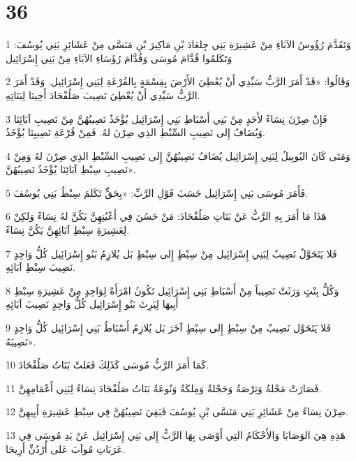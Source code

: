 \chapter{36}

\par 1 وَتَقَدَّمَ رُؤُوسُ الآبَاءِ مِنْ عَشِيرَةِ بَنِي جِلعَادَ بْنِ مَاكِيرَ بْنِ مَنَسَّى مِنْ عَشَائِرِ بَنِي يُوسُفَ: وَتَكَلمُوا قُدَّامَ مُوسَى وَقُدَّامَ رُؤَسَاءِ الآبَاءِ مِنْ بَنِي إِسْرَائِيل
\par 2 وَقَالُوا: «قَدْ أَمَرَ الرَّبُّ سَيِّدِي أَنْ يُعْطِيَ الأَرْضَ بِقِسْمَةٍ بِالقُرْعَةِ لِبَنِي إِسْرَائِيل. وَقَدْ أَمَرَ الرَّبُّ سَيِّدِي أَنْ يُعْطِيَ نَصِيبَ صَلُفْحَادَ أَخِينَا لِبَنَاتِهِ.
\par 3 فَإِنْ صِرْنَ نِسَاءً لأَحَدٍ مِنْ بَنِي أَسْبَاطِ بَنِي إِسْرَائِيل يُؤْخَذُ نَصِيبُهُنَّ مِنْ نَصِيبِ آبَائِنَا وَيُضَافُ إِلى نَصِيبِ السِّبْطِ الذِي صِرْنَ لهُ. فَمِنْ قُرْعَةِ نَصِيبِنَا يُؤْخَذُ.
\par 4 وَمَتَى كَانَ اليُوبِيلُ لِبَنِي إِسْرَائِيل يُضَافُ نَصِيبُهُنَّ إِلى نَصِيبِ السِّبْطِ الذِي صِرْنَ لهُ وَمِنْ نَصِيبِ سِبْطِ آبَائِنَا يُؤْخَذُ نَصِيبُهُنَّ».
\par 5 فَأَمَرَ مُوسَى بَنِي إِسْرَائِيل حَسَبَ قَوْلِ الرَّبِّ: «بِحَقٍّ تَكَلمَ سِبْطُ بَنِي يُوسُفَ.
\par 6 هَذَا مَا أَمَرَ بِهِ الرَّبُّ عَنْ بَنَاتِ صَلُفْحَادَ: مَنْ حَسُنَ فِي أَعْيُنِهِنَّ يَكُنَّ لهُ نِسَاءً وَلكِنْ لِعَشِيرَةِ سِبْطِ آبَائِهِنَّ يَكُنَّ نِسَاءً.
\par 7 فَلا يَتَحَوَّلُ نَصِيبٌ لِبَنِي إِسْرَائِيل مِنْ سِبْطٍ إِلى سِبْطٍ بَل يُلازِمُ بَنُو إِسْرَائِيل كُلُّ وَاحِدٍ نَصِيبَ سِبْطِ آبَائِهِ.
\par 8 وَكُلُّ بِنْتٍ وَرَثَتْ نَصِيباً مِنْ أَسْبَاطِ بَنِي إِسْرَائِيل تَكُونُ امْرَأَةً لِوَاحِدٍ مِنْ عَشِيرَةِ سِبْطِ أَبِيهَا لِيَرِثَ بَنُو إِسْرَائِيل كُلُّ وَاحِدٍ نَصِيبَ آبَائِهِ
\par 9 فَلا يَتَحَوَّل نَصِيبٌ مِنْ سِبْطٍ إِلى سِبْطٍ آخَرَ بَل يُلازِمُ أَسْبَاطُ بَنِي إِسْرَائِيل كُلُّ وَاحِدٍ نَصِيبَهُ».
\par 10 كَمَا أَمَرَ الرَّبُّ مُوسَى كَذَلِكَ فَعَلتْ بَنَاتُ صَلُفْحَادَ.
\par 11 فَصَارَتْ مَحْلةُ وَتِرْصَةُ وَحَجْلةُ وَمِلكَةُ وَنُوعَةُ بَنَاتُ صَلُفْحَادَ نِسَاءً لِبَنِي أَعْمَامِهِنَّ.
\par 12 صِرْنَ نِسَاءً مِنْ عَشَائِرِ بَنِي مَنَسَّى بْنِ يُوسُفَ فَبَقِيَ نَصِيبُهُنَّ فِي سِبْطِ عَشِيرَةِ أَبِيهِنَّ.
\par 13 هَذِهِ هِيَ الوَصَايَا وَالأَحْكَامُ التِي أَوْصَى بِهَا الرَّبُّ إِلى بَنِي إِسْرَائِيل عَنْ يَدِ مُوسَى فِي عَرَبَاتِ مُوآبَ عَلى أُرْدُنِّ أَرِيحَا.

